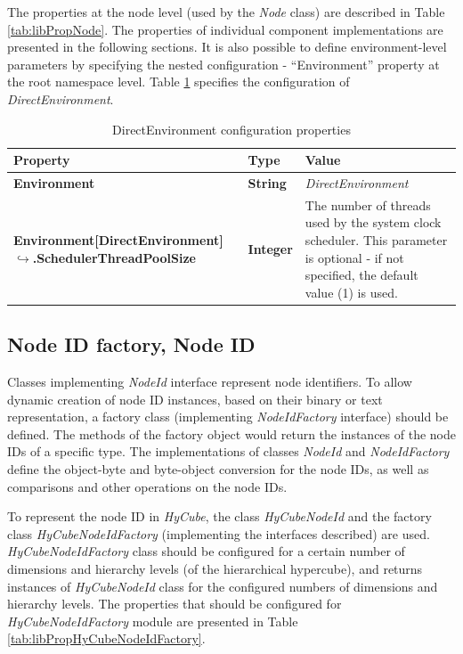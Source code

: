 The properties at the node level (used by the \emph{Node} class) are described in Table \ref{tab:libPropNode}. The properties of individual component implementations are presented in the following sections. It is also possible to define environment-level parameters by specifying the nested configuration - ``Environment'' property at the root namespace level. Table \ref{tab:libDirectEnvironment} specifies the configuration of \emph{DirectEnvironment}.

\begin{table}
\scriptsize
\begin{center}
\begin{tabular}{p{5cm} p{2cm} p{7.5cm}}
	\hline
	\textbf{Property}									& \textbf{Type}									& \textbf{Value}																	\\[1mm]
    \hline
	\textbf{Environment}								& \textbf{String}								& \textit{DirectEnvironment}														\\[1.5mm]
    \textbf{Environment[DirectEnvironment] \newline $\hookrightarrow$.SchedulerThreadPoolSize}			& \textbf{Integer}							& The number of threads used by the system clock scheduler. This parameter is optional - if not specified, the default value (1) is used.							\\[1.5mm]
    \hline
\end{tabular}
\end{center}
\caption{DirectEnvironment configuration properties}
\label{tab:libDirectEnvironment}
\end{table}





\subsection{Node ID factory, Node ID}

Classes implementing \emph{NodeId} interface represent node identifiers. To allow dynamic creation of node ID instances, based on their binary or text representation, a factory class (implementing \emph{NodeIdFactory} interface) should be defined. The methods of the factory object would return the instances of the node IDs of a specific type. The implementations of classes \emph{NodeId} and \emph{NodeIdFactory} define the object-byte and byte-object conversion for the node IDs, as well as comparisons and other operations on the node IDs.

To represent the node ID in \emph{HyCube}, the class \emph{HyCubeNodeId} and the factory class \emph{HyCubeNodeIdFactory} (implementing the interfaces described) are used. \emph{HyCubeNodeIdFactory} class should be configured for a certain number of dimensions and hierarchy levels (of the hierarchical hypercube), and returns instances of \emph{HyCubeNodeId} class for the configured numbers of dimensions and hierarchy levels. The properties that should be configured for \emph{HyCubeNodeIdFactory} module are presented in Table \ref{tab:libPropHyCubeNodeIdFactory}.


